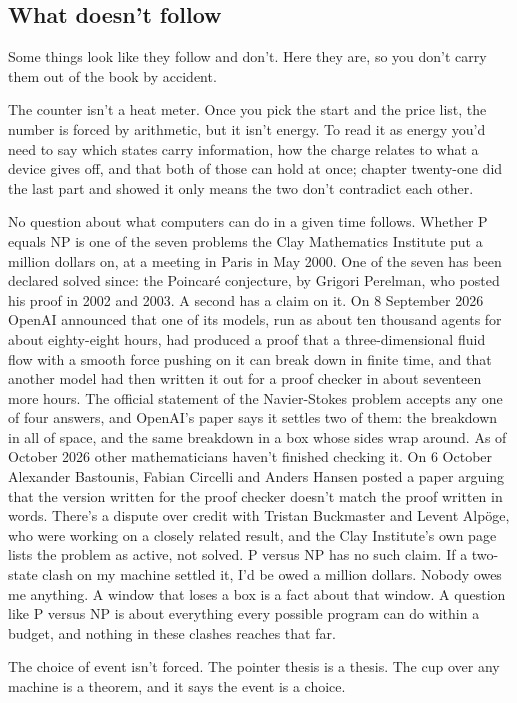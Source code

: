 \documentclass[11pt,twoside]{article}
\theoremstyle{thielethm}
\theoremstyle{thieledef}
\theoremstyle{thieledef}
\theoremstyle{thieledef}
\theoremstyle{thielethm}
\theoremstyle{thieleobs}
\theoremstyle{thielethm}
\begin{document}
\subsection{What doesn't follow}

Some things look like they follow and don't. Here they are, so you don't carry them out of the book by accident.

The counter isn't a heat meter. Once you pick the start and the price list, the number is forced by arithmetic, but it isn't energy. To read it as energy you'd need to say which states carry information, how the charge relates to what a device gives off, and that both of those can hold at once; chapter twenty-one did the last part and showed it only means the two don't contradict each other.

No question about what computers can do in a given time follows. Whether P equals NP is one of the seven problems the Clay Mathematics Institute put a million dollars on, at a meeting in Paris in May 2000. One of the seven has been declared solved since: the Poincaré conjecture, by Grigori Perelman, who posted his proof in 2002 and 2003. A second has a claim on it. On 8 September 2026 OpenAI announced that one of its models, run as about ten thousand agents for about eighty-eight hours, had produced a proof that a three-dimensional fluid flow with a smooth force pushing on it can break down in finite time, and that another model had then written it out for a proof checker in about seventeen more hours. The official statement of the Navier-Stokes problem accepts any one of four answers, and OpenAI's paper says it settles two of them: the breakdown in all of space, and the same breakdown in a box whose sides wrap around. As of October 2026 other mathematicians haven't finished checking it. On 6 October Alexander Bastounis, Fabian Circelli and Anders Hansen posted a paper arguing that the version written for the proof checker doesn't match the proof written in words. There's a dispute over credit with Tristan Buckmaster and Levent Alpöge, who were working on a closely related result, and the Clay Institute's own page lists the problem as active, not solved. P versus NP has no such claim. If a two-state clash on my machine settled it, I'd be owed a million dollars. Nobody owes me anything. A window that loses a box is a fact about that window. A question like P versus NP is about everything every possible program can do within a budget, and nothing in these clashes reaches that far.

The choice of event isn't forced. The pointer thesis is a thesis. The cup over any machine is a theorem, and it says the event is a choice.
\end{document}
